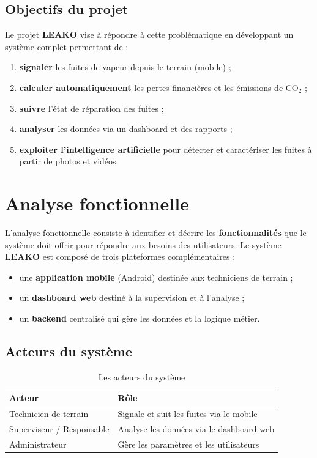 \documentclass[12pt,a4paper,oneside]{report}
\begin{document}
\section{Objectifs du projet}

Le projet \textbf{LEAKO} vise à répondre à cette problématique en développant un système complet permettant de :
\begin{enumerate}
    \item \textbf{signaler} les fuites de vapeur depuis le terrain (mobile) ;
    \item \textbf{calculer automatiquement} les pertes financières et les émissions de CO$_2$ ;
    \item \textbf{suivre} l'état de réparation des fuites ;
    \item \textbf{analyser} les données via un dashboard et des rapports ;
    \item \textbf{exploiter l'intelligence artificielle} pour détecter et caractériser les fuites à partir de photos et vidéos.
\end{enumerate}

\chapter{Analyse fonctionnelle}

L'analyse fonctionnelle consiste à identifier et décrire les \textbf{fonctionnalités} que le système doit offrir pour répondre aux besoins des utilisateurs. Le système \textbf{LEAKO} est composé de trois plateformes complémentaires :
\begin{itemize}
    \item une \textbf{application mobile} (Android) destinée aux techniciens de terrain ;
    \item un \textbf{dashboard web} destiné à la supervision et à l'analyse ;
    \item un \textbf{backend} centralisé qui gère les données et la logique métier.
\end{itemize}

\section{Acteurs du système}

\begin{table}[H]
\centering
\begin{tabular}{@{}ll@{}}
\toprule
\textbf{Acteur} & \textbf{Rôle} \\
\midrule
Technicien de terrain & Signale et suit les fuites via le mobile \\
Superviseur / Responsable & Analyse les données via le dashboard web \\
Administrateur & Gère les paramètres et les utilisateurs \\
\bottomrule
\end{tabular}
\caption{Les acteurs du système}
\end{table}
\end{document}
